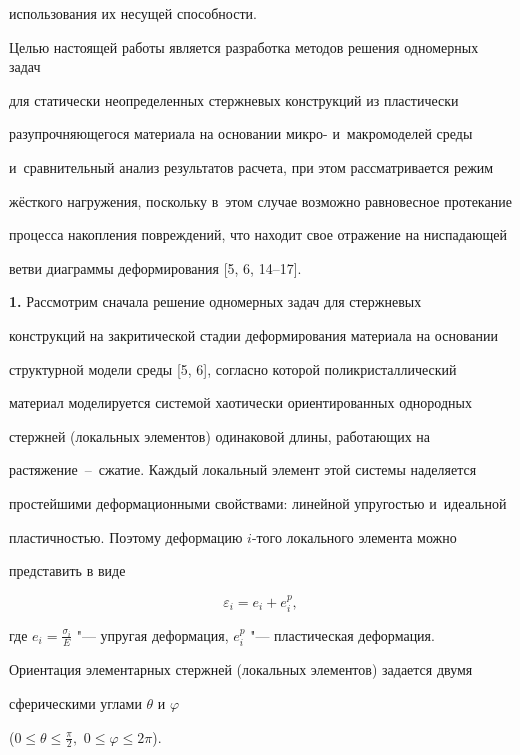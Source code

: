 использования их несущей способности.



Целью настоящей работы является разработка методов решения одномерных задач

для статически неопределенных стержневых конструкций из пластически

разупрочняющегося материала на основании микро- и~макромоделей среды 

и~сравнительный анализ результатов расчета, при этом рассматривается режим

жёсткого нагружения, поскольку в~этом случае возможно равновесное протекание

процесса накопления повреждений, что находит свое отражение на ниспадающей

ветви диаграммы деформирования [5, 6, 14--17].



{\bf 1.} Рассмотрим сначала решение одномерных задач для стержневых

конструкций на закритической стадии деформирования материала на основании

структурной модели среды [5, 6], согласно которой поликристаллический

материал моделируется системой хаотически ориентированных однородных

стержней (локальных элементов) одинаковой длины, работающих на

растяжение~--~сжатие. Каждый локальный элемент этой системы наделяется

простейшими деформационными свойствами: линейной упругостью и~идеальной

пластичностью. Поэтому деформацию $i$-того локального элемента можно

представить в виде

\begin{equation}

\label{andreeva:eq1}

\varepsilon _i =e_i +e_i^p ,

\end{equation}

где $e_i =\frac{\sigma _i }{E}$ "--- упругая деформация, $e_i^p $ "--- пластическая деформация.



Ориентация элементарных стержней (локальных элементов) задается двумя

сферическими углами $\theta$ и $\varphi$ 

($0 \leq \theta \leq \frac{\pi}{2},$ $0 \leq \varphi \leq 2 \pi $). 


